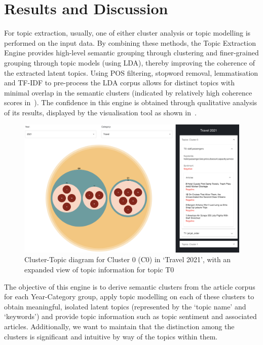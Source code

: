 \vspace{-2em}
\section{Results and Discussion}

For topic extraction, usually, one of either cluster analysis or topic modelling is performed on the input data. By combining these methods, the Topic Extraction Engine provides high-level semantic grouping through clustering and finer-grained grouping through topic models (using LDA), thereby improving the coherence of the extracted latent topics. Using POS filtering, stopword removal, lemmatisation and TF-IDF to pre-process the LDA corpus allows for distinct topics with minimal overlap in the semantic clusters (indicated by relatively high coherence scores in~). The confidence in this engine is obtained through qualitative analysis of its results, displayed by the visualisation tool as shown in~.
\vspace{-1.5em}
\begin{figure}[H]
  \centering
  \includegraphics[width=0.93\linewidth]{images/travel2021_topics_cropped.png}
  \caption{Cluster-Topic diagram for Cluster 0 (C0) in `Travel 2021', with an expanded view of topic information for topic T0}
  \label{fig:topics_travel2021}
\end{figure}

The objective of this engine is to derive semantic clusters from the article corpus for each Year-Category group, apply topic modelling on each of these clusters to obtain meaningful, isolated latent topics (represented by the `topic name' and `keywords') and provide topic information such as topic sentiment and associated articles. Additionally, we want to maintain that the distinction among the clusters is significant and intuitive by way of the topics within them.  

